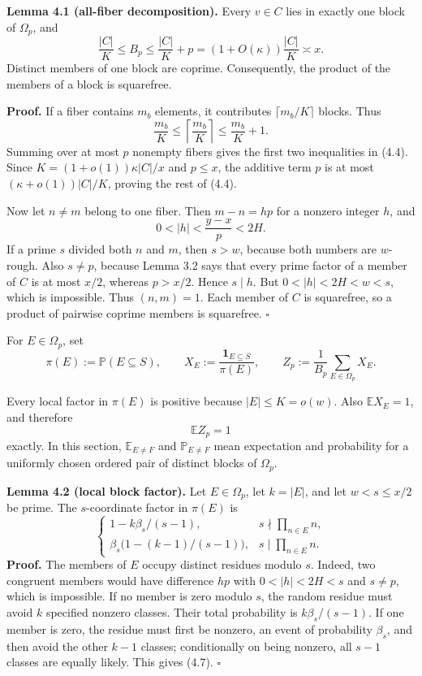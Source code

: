 \documentclass[10pt,letterpaper]{article}
\newcommand{\PP}{\mathbb{P}}
\newcommand{\EE}{\mathbb{E}}
\newcommand{\ind}{\mathbf{1}}
\newcommand{\qedmark}{\(\square\)}
\begin{document}
\textbf{Lemma 4.1 (all-fiber decomposition).} Every $v\in C$ lies in exactly one block of $\Omega_p$, and
\begin{equation}
\frac{|C|}{K}\le B_p\le\frac{|C|}{K}+p=(1+O(\kappa))\frac{|C|}{K}\asymp x.
\tag{4.4}
\end{equation}
Distinct members of one block are coprime. Consequently, the product of the members of a block is squarefree.

\textbf{Proof.} If a fiber contains $m_b$ elements, it contributes $\lceil m_b/K\rceil$ blocks. Thus
\[
\frac{m_b}{K}\le\left\lceil\frac{m_b}{K}\right\rceil\le\frac{m_b}{K}+1.
\]
Summing over at most $p$ nonempty fibers gives the first two inequalities in (4.4). Since $K=(1+o(1))\kappa|C|/x$
and $p\le x$, the additive term $p$ is at most $(\kappa+o(1))|C|/K$, proving the rest of (4.4).

Now let $n\ne m$ belong to one fiber. Then $m-n=hp$ for a nonzero integer $h$, and
\[
0<|h|<\frac{y-x}{p}<2H.
\]
If a prime $s$ divided both $n$ and $m$, then $s>w$, because both numbers are $w$-rough. Also $s\ne p$, because
Lemma 3.2 says that every prime factor of a member of $C$ is at most $x/2$, whereas $p>x/2$. Hence $s\mid h$. But
$0<|h|<2H<w<s$, which is impossible. Thus $(n,m)=1$. Each member of $C$ is squarefree, so a product of
pairwise coprime members is squarefree. \qedmark

For $E\in\Omega_p$, set
\begin{equation}
\pi(E):=\PP(E\subseteq S),\qquad
X_E:=\frac{\ind_{E\subseteq S}}{\pi(E)},\qquad
Z_p:=\frac1{B_p}\sum_{E\in\Omega_p}X_E.
\tag{4.5}
\end{equation}

Every local factor in $\pi(E)$ is positive because $|E|\le K=o(w)$. Also $\EE X_E=1$, and therefore
\begin{equation}
\EE Z_p=1
\tag{4.6}
\end{equation}
exactly. In this section, $\EE_{E\ne F}$ and $\PP_{E\ne F}$ mean expectation and probability for a uniformly chosen ordered
pair of distinct blocks of $\Omega_p$.

\textbf{Lemma 4.2 (local block factor).} Let $E\in\Omega_p$, let $k=|E|$, and let $w<s\le x/2$ be prime. The $s$-coordinate
factor in $\pi(E)$ is
\begin{equation}
\begin{cases}
1-k\beta_s/(s-1),&s\nmid\prod_{n\in E}n,\\[2pt]
\beta_s\bigl(1-(k-1)/(s-1)\bigr),&s\mid\prod_{n\in E}n.
\end{cases}
\tag{4.7}
\end{equation}
\textbf{Proof.} The members of $E$ occupy distinct residues modulo $s$. Indeed, two congruent members would have
difference $hp$ with $0<|h|<2H<s$ and $s\ne p$, which is impossible. If no member is zero modulo $s$, the random
residue must avoid $k$ specified nonzero classes. Their total probability is $k\beta_s/(s-1)$. If one member is zero, the
residue must first be nonzero, an event of probability $\beta_s$, and then avoid the other $k-1$ classes; conditionally
on being nonzero, all $s-1$ classes are equally likely. This gives (4.7). \qedmark
\end{document}
